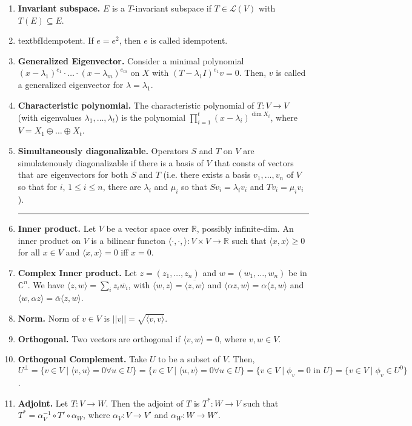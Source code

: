 \begin{enumerate}
	\item \textbf{Invariant subspace. } $E$ is a $T$-invariant subspace if $T \in \mathscr{L}(V)$ with $T(E) \subseteq E$. 
	\item textbf{Idempotent. } If $e = e^2$, then $e$ is called idempotent. 
	\item \textbf{Generalized Eigenvector. } Consider a minimal polynomial $(x-\lambda_1)^{e_1} \cdot \dots \cdot (x-\lambda_m)^{e_m}$ on $X$ with $(T-\lambda_1I)^{e_1}v = 0$. Then, $v$ is called a generalized eigenvector for $\lambda = \lambda_1$. 
	\item \textbf{Characteristic polynomial. } The characteristic polynomial of $T: V \to V$ (with eigenvalues $\lambda_1,\dots,\lambda_t$) is the polynomial $\prod_{i=1}^{t} (x-\lambda_i)^{\dim X_i}$, where $V = X_1 \oplus \dots \oplus X_t$. 
	\item \textbf{Simultaneously diagonalizable. } Operators $S$ and $T$ on $V$ are simulatenously diagonalizable if there is a basis of $V$ that consts of vectors that are eigenvectors for both $S$ and $T$ (i.e. there exists a basis $v_1,\dots,v_n$ of $V$ so that for $i$, $1 \leq i \leq n$, there are $\lambda_i$ and $\mu_i$ so that $Sv_i = \lambda_iv_i$ and $Tv_i = \mu_iv_i$). 
	\begin{center}
		\hrule
	\end{center}
	\item \textbf{Inner product. } Let $V$ be a vector space over $\mathbb{R}$, possibly infinite-dim. An inner product on $V$ is a bilinear functon $\langle \cdot, \cdot, \rangle: V \times V \to \mathbb{R}$ such that $\langle x, x \rangle \geq 0$ for all $x \in V$ and $\langle x, x \rangle = 0$ iff $x =0$. 
	\item \textbf{Complex Inner product. } Let $z=(z_1,\dots,z_n)$ and $w=(w_1,\dots,w_n)$ be in $\mathbb{C}^n$. We have $\langle z, w \rangle = \sum_{i} z_i \overline{w_i}$, with $\langle w, z \rangle = \overline{\langle z, w \rangle}$ and $\langle \alpha z, w \rangle = \alpha \langle z, w \rangle$ and $\langle w, \alpha z \rangle = \overline{\alpha}\langle z, w \rangle$. 
	\item \textbf{Norm. } Norm of $v \in V$ is $||v|| = \sqrt{\langle v, v \rangle}$. 
	\item \textbf{Orthogonal. } Two vectors are orthogonal if $\langle v,w \rangle = 0$, where $v,w \in V$. 
	\item \textbf{Orthogonal Complement. } Take $U$ to be a subset of $V$. Then, $U^\perp = \{v \in V \mid \langle v,u \rangle = 0 \forall u \in U\} = \{v \in V \mid \langle u,v \rangle = 0 \forall u \in U\} = \{v \in V \mid \phi_v = 0 \textrm{ in } U\} = \{v \in V \mid \phi_v \in U^0\}$. 
	\item \textbf{Adjoint. } Let $T: V \to W$. Then the adjoint of $T$ is $T^*: W \to V$ such that $T^* = \alpha_V^{-1} \circ T' \circ \alpha_W$, where $\alpha_V: V \to V'$ and $\alpha_W: W \to W'$. 
\end{enumerate}


